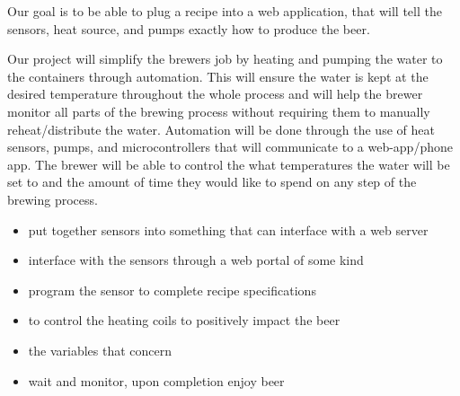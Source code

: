 

Our goal is to be able to plug a recipe into a web application, that will tell the sensors, heat source, and pumps exactly how to produce the beer. 

\vspace{5mm}

Our project will simplify the brewers job by heating and pumping the water to the containers through automation. This will
ensure the water is kept at the desired temperature throughout the whole process and will help the brewer monitor all
parts of the brewing process without requiring them to manually reheat/distribute the water. Automation will be done through the use of heat sensors, pumps, and microcontrollers that will communicate to a web-app/phone app.
The brewer will be able to
control the what temperatures the water will be set to and the amount of time they would like to spend on any step of the brewing process.

\begin{itemize}
  
  \item put together sensors into something that can interface with a web server
  \item interface with the sensors through a web portal of some kind
  \item program the sensor to complete recipe specifications
  \item to control the heating coils to positively impact the beer
  \item the variables that concern
   
  \item wait and monitor, upon completion enjoy beer

\end{itemize}